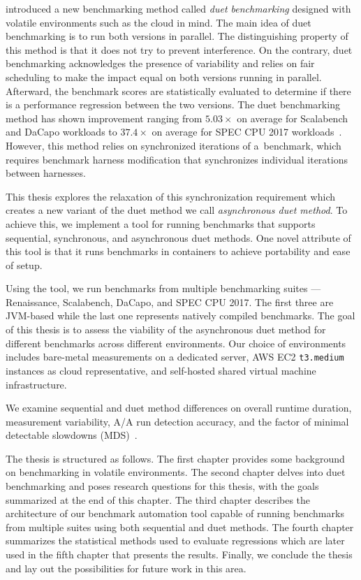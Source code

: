 \citet{bulej2020duet} introduced a new benchmarking method called \emph{duet benchmarking} designed with volatile environments such as the cloud in mind.
The main idea of duet benchmarking is to run both versions in parallel.
The distinguishing property of this method is that it does not try to prevent interference.
On the contrary, duet benchmarking acknowledges the presence of variability and relies on fair scheduling to make the impact equal on both versions running in parallel.
Afterward, the benchmark scores are statistically evaluated to determine if there is a performance regression between the two versions.
The duet benchmarking method has shown improvement ranging from $5.03 \times$ on average for Scalabench and DaCapo workloads to $37.4 \times$ on average for SPEC CPU 2017 workloads~\cite{bulej2020duet}.
However, this method relies on synchronized iterations of a~benchmark, which requires benchmark harness modification that synchronizes individual iterations between harnesses.

This thesis explores the relaxation of this synchronization requirement which creates a new variant of the duet method we call \emph{asynchronous duet method}.
To achieve this, we implement a tool for running benchmarks that supports sequential, synchronous, and asynchronous duet methods.
One novel attribute of this tool is that it runs benchmarks in containers to achieve portability and ease of setup.

Using the tool, we run benchmarks from multiple benchmarking suites --- Renaissance, Scalabench, DaCapo, and SPEC CPU 2017.
The first three are \mbox{JVM-based} while the last one represents natively compiled benchmarks.
The goal of this thesis is to assess the viability of the asynchronous duet method for different benchmarks across different environments.
Our choice of environments includes \mbox{bare-metal} measurements on a dedicated server, AWS EC2 \lstinline{t3.medium} instances as cloud representative, and self-hosted shared virtual machine infrastructure.

We examine sequential and duet method differences on overall runtime duration, measurement variability, A/A run detection accuracy, and the factor of minimal detectable slowdowns (MDS)~\cite{laaber2019software}.

The thesis is structured as follows.
The first chapter provides some background on benchmarking in volatile environments.
The second chapter delves into duet benchmarking and poses research questions for this thesis, with the goals summarized at the end of this chapter.
The third chapter describes the architecture of our benchmark automation tool capable of running benchmarks from multiple suites using both sequential and duet methods.
The fourth chapter summarizes the statistical methods used to evaluate regressions which are later used in the fifth chapter that presents the results.
Finally, we conclude the thesis and lay out the possibilities for future work in this area.
